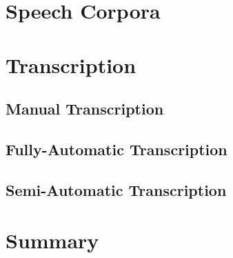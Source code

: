 \section{Speech Corpora}\label{sec:}

\section{Transcription}\label{sec:transcription}

\subsection{Manual Transcription}\label{subsec:manual-transcription}

\subsection{Fully-Automatic Transcription}\label{subsec:full-auto-transcription}

\subsection{Semi-Automatic Transcription}\label{subsec:semi-auto-transcription}

\section{Summary}\label{sec:lit-survey-summary}
\mycomment{
    }
